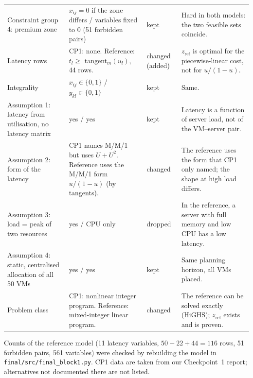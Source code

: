 \documentclass[11pt,a4paper]{article}
\newcommand{\zref}{z_{\mathrm{ref}}}
\begin{document}
{\begin{xltabular}{\textwidth}{@{}>{\raggedright\arraybackslash}p{2.6cm}>{\raggedright\arraybackslash}X>{\raggedright\arraybackslash}p{1.5cm}>{\raggedright\arraybackslash}X@{}}
Constraint group 4: premium zone & $x_{ij}=0$ if the zone differs / variables fixed to 0 (51 forbidden pairs) & kept & Hard in both models: the two feasible sets coincide.\\
Latency rows & CP1: none. Reference: $t_l\ge$ tangent$_m(u_l)$, 44 rows. & changed (added) & $\zref$ is optimal for the piecewise-linear cost, not for $u/(1-u)$.\\
Integrality & $x_{ij}\in\{0,1\}$ / $y_{kl}\in\{0,1\}$ & kept & Same.\\
Assumption 1: latency from utilisation, no latency matrix & yes / yes & kept & Latency is a function of server load, not of the VM--server pair.\\
Assumption 2: form of the latency & CP1 names M/M/1 but uses $U+U^2$. Reference uses the M/M/1 form $u/(1-u)$ (by tangents). & changed & The reference uses the form that CP1 only named; the shape at high load differs.\\
Assumption 3: load = peak of two resources & yes / CPU only & dropped & In the reference, a server with full memory and low CPU has a low latency.\\
Assumption 4: static, centralised allocation of all 50 VMs & yes / yes & kept & Same planning horizon, all VMs placed.\\
Problem class & CP1: nonlinear integer program. Reference: mixed-integer linear program. & changed & The reference can be solved exactly (HiGHS); $\zref$ exists and is proven.\\
\bottomrule
\end{xltabular}}

{\small Counts of the reference model (11 latency variables, $50+22+44=116$ rows, 51 forbidden pairs, 561 variables) were checked by rebuilding the model in \texttt{final/src/final\_block1.py}. CP1 data are taken from our Checkpoint~1 report; alternatives not documented there are not listed.\par}
\end{document}
